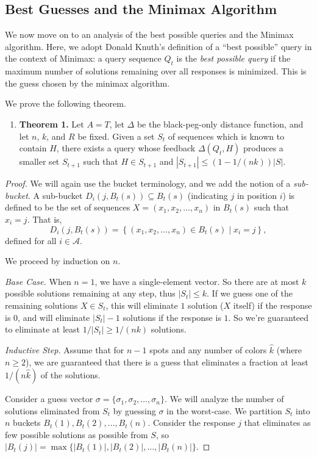 \documentclass[12pt, a4paper]{article}
\begin{document}
\subsection{Best Guesses and the Minimax Algorithm}
We now move on to an analysis of the best possible queries and the Minimax algorithm. Here, we adopt Donald Knuth's definition of a ``best possible'' query in the context of Minimax\cite{DK76}: a query sequence $Q_t$ is the \textit{best possible query} if the maximum number of solutions remaining over all responses is minimized. This is the guess chosen by the minimax algorithm.

We prove the following theorem.
\begin{enumerate}[label=]
	\item\textbf{Theorem 1.} Let $A=T$, let $\Delta$ be the black-peg-only distance function, and let $n$, $k$, and $R$ be fixed. Given a set $S_{t}$ of sequences which is known to contain $H$, there exists a query whose feedback $\Delta(Q_t, H)$ produces a smaller set $S_{t+1}$ such that $H\in S_{t+1}$ and $|S_{t+1}|\le (1-1/(nk))|S|$.	
\end{enumerate}
\begin{proof}
	We will again use the bucket terminology, and we add the notion of a \textit{sub-bucket}. A sub-bucket $D_i(j, B_t(s))\subseteq B_t(s)$ (indicating $j$ in position $i$) is defined to be the set of sequences $X = (x_1, x_2, \ldots, x_n)$ in $B_t(s)$ such that $x_i = j$. That is,
	\begin{equation*}
		D_i(j, B_t(s)) = \left\{(x_1, x_2, \ldots, x_n)\in B_t(s)\mid x_i = j\right\},
	\end{equation*}
	defined for all $i\in\mathcal{A}$.

	We proceed by induction on $n$.
	
	\textit{Base Case.} When $n=1$, we have a single-element vector. So there are at most $k$ possible solutions remaining at any step, thus $|S_t|\le k$. If we guess one of the remaining solutions $X\in S_t$, this will eliminate $1$ solution ($X$ itself) if the response is $0$, and will eliminate $|S_t|-1$ solutions if the response is $1$. So we're guaranteed to eliminate at least $1/|S_t|\ge 1/(nk)$ solutions.
		
	\textit{Inductive Step.} Assume that for $n-1$ spots and any number of colors $\widehat{k}$ (where $n\ge 2$), we are guaranteed that there is a guess that eliminates a fraction at least $1/(n\widehat{k})$ of the solutions.
		
	Consider a guess vector $\sigma=\{\sigma_1, \sigma_2, \ldots, \sigma_n\}$. We will analyze the number of solutions eliminated from $S_t$ by guessing $\sigma$ in the worst-case. We partition $S_t$ into $n$ buckets $B_t(1), B_t(2), \ldots, B_t(n)$. Consider the response $j$ that eliminates as few possible solutions as possible from $S$, so $|B_t(j)| = \max\{|B_t(1)|, |B_t(2)|, \ldots, |B_t(n)|\}$.
	
	
\end{proof}

\clearpage


\end{document}
